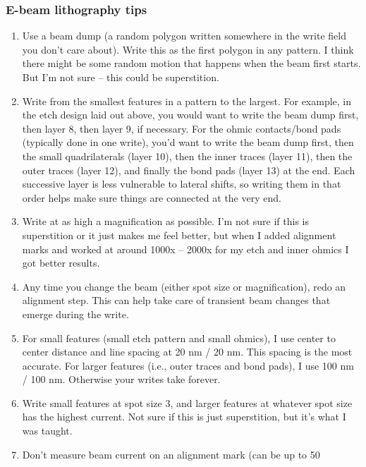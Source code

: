 \begin{appendices}
\subsubsection{E-beam lithography tips}
\begin{enumerate}
	\item Use a beam dump (a random polygon written somewhere in the write field you don’t care about). Write this as the first polygon in any pattern. I think there might be some random motion that happens when the beam first starts. But I’m not sure – this could be superstition.
	\item Write from the smallest features in a pattern to the largest. For example, in the etch design laid out above, you would want to write the beam dump first, then layer 8, then layer 9, if necessary. For the ohmic contacts/bond pads (typically done in one write), you’d want to write the beam dump first, then the small quadrilaterals (layer 10), then the inner traces (layer 11), then the outer traces (layer 12), and finally the bond pads (layer 13) at the end. Each successive layer is less vulnerable to lateral shifts, so writing them in that order helps make sure things are connected at the very end.
	\item Write at as high a magnification as possible. I’m not sure if this is superstition or it just makes me feel better, but when I added alignment marks and worked at around 1000x – 2000x for my etch and inner ohmics I got better results.
	\item Any time you change the beam (either spot size or magnification), redo an alignment step. This can help take care of transient beam changes that emerge during the write.
	\item For small features (small etch pattern and small ohmics), I use center to center distance and line spacing at 20 nm / 20 nm. This spacing is the most accurate. For larger features (i.e., outer traces and bond pads), I use 100 nm / 100 nm. Otherwise your writes take forever.
	\item Write small features at spot size 3, and larger features at whatever spot size has the highest current. Not sure if this is just superstition, but it’s what I was taught.
	\item Don’t measure beam current on an alignment mark (can be up to 50%

\end{enumerate}
\end{appendices}
